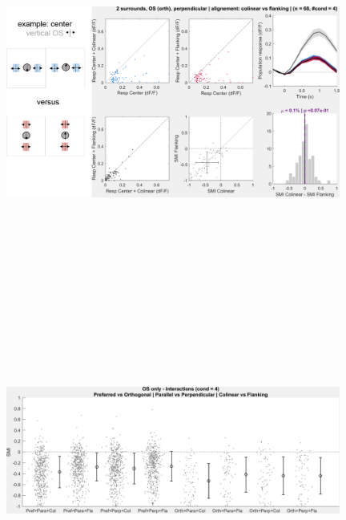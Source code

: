 \begin{figure}[H] \centering \includegraphics[width=11cm,height=11cm,keepaspectratio]{Figures/7.Results/population/sel/diagrams/16.png} 
\end{figure}

\begin{figure}[H] \centering \includegraphics[width=11cm,height=11cm,keepaspectratio]{Figures/7.Results/population/sel/31_popPlots_VisROIs_COS_2SalignmentAngle.png} 
\end{figure}

